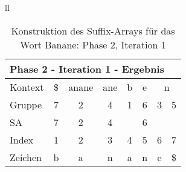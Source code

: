 \begin{table}[H]
\begin{adjustbox}{max width=\textwidth}
\begin{tabular}{ll}
\begin{tabular}{lccccccc}
\multicolumn{8}{l}{Phase 2 - Iteration 1 - Ergebnis}                                                                                                                                                                                       \\ \hline
\multicolumn{1}{l|}{Kontext} & \multicolumn{1}{c|}{\$} & \multicolumn{1}{c|}{anane}                     & \multicolumn{1}{c|}{ane}                       & \multicolumn{1}{c|}{b} & \multicolumn{1}{c|}{e}                         & \multicolumn{2}{c}{n}   \\
\multicolumn{1}{l|}{Gruppe}  & \multicolumn{1}{c|}{7}  & \multicolumn{1}{c|}{2}                         & \multicolumn{1}{c|}{4}                         & \multicolumn{1}{c|}{1} & \multicolumn{1}{c|}{6}                         & 3 & 5  \\ 
\multicolumn{1}{l|}{SA}      & \multicolumn{1}{c|}{7}  & \multicolumn{1}{c|}{\cellcolor[HTML]{\yellow}2} & \multicolumn{1}{c|}{\cellcolor[HTML]{\yellow}4} & \multicolumn{1}{c|}{}  & \multicolumn{1}{c|}{\cellcolor[HTML]{\yellow}6} &   &    \\ \hline
\multicolumn{1}{l|}{Index}   & 1                       & 2                                              & 3                                              & 4                      & 5                                              & 6 & 7  \\
\multicolumn{1}{l|}{Zeichen} & b                       & a                                              & n                                              & a                      & n                                              & e & \$
\end{tabular}

\end{tabular}
\end{adjustbox}

\caption[Konstruktion des Suffix-Arrays für das Wort Banane: Phase 2, Iteration 1]{Konstruktion des Suffix-Arrays für das Wort Banane: Phase 2, Iteration 1}
\label{fig_banane_2_1} 
\end{table}
